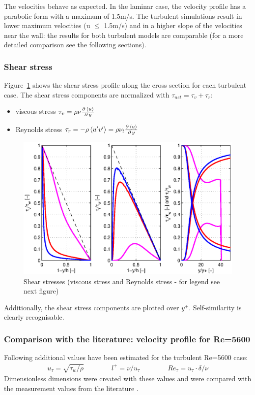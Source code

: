 \noii The velocities behave as expected. In the laminar case, the velocity profile has a parabolic form with a maximum of 1.5m/s. The turbulent simulations result in lower maximum velocities (u $\le$ 1.5m/s) and in a higher slope of the velocities near the wall: the results for both turbulent models are comparable (for a more detailed comparison see the following sections).

\newpage
\subsubsection*{Shear stress}

Figure~\ref{fig:channel-tau} shows the shear stress profile along the cross section for each turbulent case. The shear stress components are normalized with $\tau_{net}=\tau_v+\tau_r$:

\begin{itemize}
\item viscous stress $\tau_v=\rho\nu\frac{\partial\,\left\langle u \right\rangle}{\partial\,y}$
\item Reynolds stress $\tau_r=-\rho\left\langle u' v' \right\rangle=\rho\nu_t\frac{\partial\,\left\langle u \right\rangle}{\partial\,y}$
\end{itemize}

\begin{figure}[!htb]
\centering
\includegraphics[width=1.0\textwidth]{FIGURES/tau.eps}
\caption{Shear stresses (viscous stress and Reynolds stress - for legend see next figure)}
\label{fig:channel-tau}
\end{figure} 

\noindent Additionally, the shear stress components are plotted over $y^+$. Self-similarity is clearly recognisable.


\newpage
\subsubsection*{Comparison with the literature: velocity profile for Re=5600}\label{ssub:litkim}
Following additional values have been estimated for the turbulent Re=5600 case:
\begin{align}
u_\tau=\sqrt{\tau_w/\rho}
\qquad\qquad
l^+=\nu/u_\tau
\qquad\qquad
Re_\tau=u_\tau\cdot\delta/\nu
\end{align}
Dimensionless dimensions were created with these values and were compared with the measurement values from the literature \citep{kim1987}.

